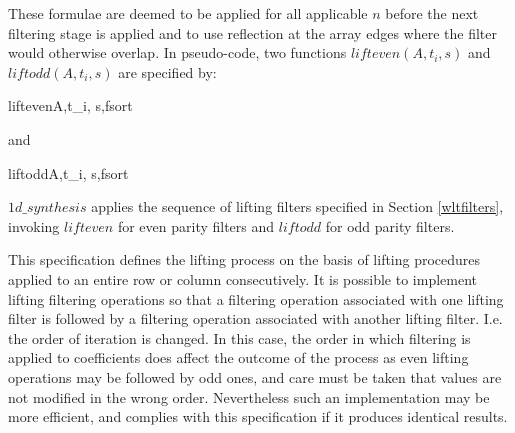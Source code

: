 These formulae are deemed to be applied for all applicable $n$
before the next filtering stage is applied and to use reflection at the array
edges where the filter would otherwise overlap. In pseudo-code, two
functions $lifteven(A, t_i, s)$ and $liftodd(A, t_i, s)$ are specified by:

\begin{pseudo}{lifteven}{A,t_i, s,fsort}
        \bsELSE
        \bsEND
    \bsEND
    \bsELSE
\bsEND
\end{pseudo}

and

\begin{pseudo}{liftodd}{A,t_i, s,fsort}
        \bsELSE
        \bsEND
    \bsEND
    \bsELSE
\bsEND\end{pseudo}

$1d\_synthesis$ applies the sequence of lifting filters specified in Section \ref{wltfilters},
invoking $lifteven$ for even parity filters and $liftodd$ for odd parity filters.

\begin{informative}
This specification defines the lifting process on the basis of lifting
procedures applied to an entire row or column consecutively. It is
possible to implement lifting filtering operations so that a filtering
operation associated with one lifting filter is followed by a filtering
operation associated with another lifting filter. I.e. the order of
iteration is changed. In this case, the order in which filtering is
applied to coefficients does affect the outcome of the process as even
lifting operations may be followed by odd ones, and care must be taken
that values are not modified in the wrong order. Nevertheless such an
implementation may be more efficient, and complies with this
specification if it produces identical results.
\end{informative}

